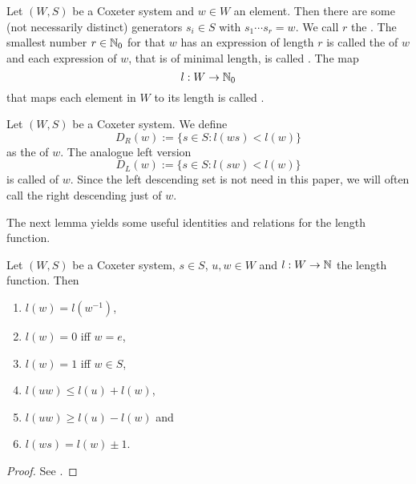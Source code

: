 \begin{defi}
	Let $(W,S)$ be a Coxeter system and $w \in W$ an element. Then there are some (not necessarily distinct) generators $s_i \in S$ with $s_1 \cdots s_r = w$. We call $r$ the . The smallest number $r \in \mathbb{N}_0$ for that $w$ has an expression of length $r$ is called the  of $w$ and each expression of $w$, that is of minimal length, is called . The map
	$$ l : W \to \mathbb{N}_0 $$
	that maps each element in $W$ to its length is called .
\end{defi}

\begin{defi}
	Let $(W,S)$ be a Coxeter system. We define
	$$ D_R(w) := \{ s \in S : l(ws) < l(w) \} $$
	as the  of $w$. The analogue left version
	$$ D_L(w) := \{ s \in S : l(sw) < l(w) \} $$
	is called  of $w$. Since the left descending set is not need in this paper, we will often call the right descending just  of $w$.
\end{defi}

The next lemma yields some useful identities and relations for the length function.

\begin{lemm}
	Let $(W,S)$ be a Coxeter system, $s \in S$, $u, w \in W$ and $l : W \to \mathbb{N}$ the length function. Then
	\begin{enumerate}
		\item $l(w) = l(w^{-1})$,
		\item $l(w) = 0$ iff $w = e$,
		\item $l(w) = 1$ iff $w \in S$,
		\item $l(uw) \leq l(u) + l(w)$,
		\item $l(uw) \geq l(u) - l(w)$ and
		\item $l(ws) = l(w) \pm 1$.
	\end{enumerate}

	\begin{proof}
		See \cite[Section 5.2]{humphreys:coxeter}.
	\end{proof}
\end{lemm}